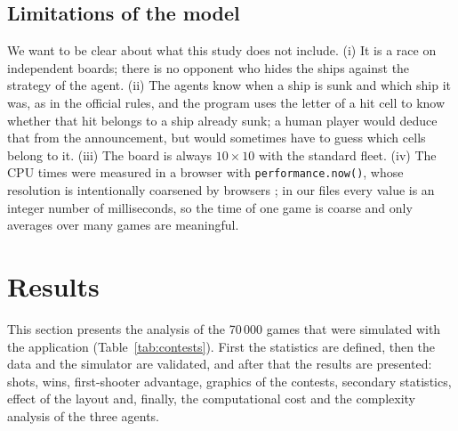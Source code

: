 \documentclass[letterpaper,11pt]{article} %
\begin{document}
\subsection{Limitations of the model}

We want to be clear about what this study does not include.
(i) It is a race on independent boards; there is no opponent who hides the ships against the strategy of the agent.
(ii) The agents know when a ship is sunk and which ship it was, as in the official rules, and the program uses the letter of a hit cell to know whether that hit belongs to a ship already sunk; a human player would deduce that from the announcement, but would sometimes have to guess which cells belong to it.
(iii) The board is always $10\times10$ with the standard fleet.
(iv) The CPU times were measured in a browser with \texttt{performance.now()}, whose resolution is intentionally coarsened by browsers \cite{mdnperf}; in our files every value is an integer number of milliseconds, so the time of one game is coarse and only averages over many games are meaningful.

\section{Results}
\label{sec:results}

This section presents the analysis of the 70\,000 games that were simulated with the application (Table~\ref{tab:contests}).
First the statistics are defined, then the data and the simulator are validated, and after that the results are presented: shots, wins, first-shooter advantage, graphics of the contests, secondary statistics, effect of the layout and, finally, the computational cost and the complexity analysis of the three agents.
\end{document}
